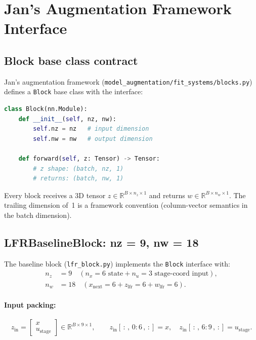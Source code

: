 \documentclass[11pt,a4paper]{article}
\newcommand{\R}{\mathbb{R}}
\newcommand{\pyfile}[1]{\texttt{#1}}
\begin{document}
\section{Jan's Augmentation Framework Interface}
\label{sec:framework}

\subsection{Block base class contract}

Jan's augmentation framework (\texttt{model\_augmentation/fit\_systems/blocks.py}) defines a
\texttt{Block} base class with the interface:
\begin{lstlisting}[language=Python]
class Block(nn.Module):
    def __init__(self, nz, nw):
        self.nz = nz   # input dimension
        self.nw = nw   # output dimension

    def forward(self, z: Tensor) -> Tensor:
        # z shape: (batch, nz, 1)
        # returns: (batch, nw, 1)
\end{lstlisting}
Every block receives a 3D tensor $z \in \R^{B \times n_z \times 1}$ and returns
$w \in \R^{B \times n_w \times 1}$. The trailing dimension of~1 is a framework convention
(column-vector semantics in the batch dimension).

\subsection{LFRBaselineBlock: nz = 9, nw = 18}

The baseline block (\pyfile{lfr\_block.py}) implements the \texttt{Block} interface with:
\begin{align}
n_z &= 9 \quad (n_x = 6 \text{ state} + n_u = 3 \text{ stage-coord input}), \\
n_w &= 18 \quad (x_{\text{next}} = 6 + z_{\text{lfr}} = 6 + w_{\text{lfr}} = 6).
\end{align}

\paragraph{Input packing:}
\begin{equation}
z_{\text{in}} = \begin{bmatrix} x \\ u_{\text{stage}} \end{bmatrix} \in \R^{B \times 9 \times 1},
\qquad
z_{\text{in}}[\,:\,,\, 0\!:\!6\,,\, :] = x, \quad
z_{\text{in}}[\,:\,,\, 6\!:\!9\,,\, :] = u_{\text{stage}}.
\end{equation}
\end{document}
